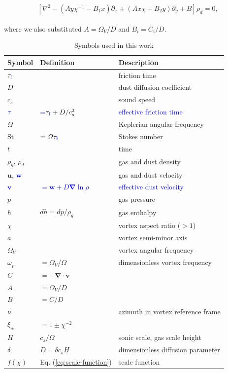 \documentclass[apj]{emulateapj}
\renewcommand{\v}[1]{{\boldsymbol{#1}}} %
\def\blue#1{\textcolor{blue}{#1}}
\newcommand{\del}{\v{\nabla}}
\newcommand{\grad}{\del}
\newcommand{\Div}{\del\cdot}
\newcommand{\Laplace}{\nabla^2}
\newcommand{\Eq}[1]{Eq. (\ref{#1})}
\newcommand{\eq}[1]{\Eq{#1}}
\newcommand{\beq}{\begin{equation}}
\newcommand{\eeq}{\end{equation}}
\newcommand{\tauf}{\tau_{\rm \blue{f}}}
\newcommand{\St}{{\rm St}}
\begin{document}
\beq
\left[\Laplace{} - \left(Ay\chi^{-1} - B_1x\right) \partial_x  +
  \left(A x \chi + B_2y\right) \partial_y + B \right] \rho_d   = 0,  
\label{eq:dust-trapping-cartesian}
\eeq
\\
\noindent where we also substituted  $A=\varOmega_V/D$ and $B_i=C_i/D$.

\begin{table}
\caption[]{Symbols used in this work}
\label{table:symbols}
\begin{center}
\begin{tabular}{l l l}\hline
Symbol & Definition & Description \\\hline
$\tauf$ && friction time\\
$D$ & & dust diffusion coefficient \\
$c_s$ & & sound speed \\
$\blue{\tau}$ &\blue{=$\tauf + D/c_s^2$}& \blue{effective friction time}\\
$\varOmega$ & & Keplerian angular frequency \\
\St & $= \varOmega \tauf$ & Stokes number \\
$t$ &  & time \\
$\rho_g$, $\rho_d$  & & gas and dust density\\
$\v{u}$, \blue{$\v{w}$} & & gas and dust velocity\\
\blue{$\v{v}$} & \blue{$= \v{w} + D\grad\ln\rho$}& \blue{effective dust velocity} \\
$p$ && gas pressure \\
$h$ &$dh=dp/\rho_g$ & gas enthalpy\\
$\chi$ & & vortex aspect ratio ($>1$) \\
$a$ & & vortex semi-minor axis \\
$\varOmega_V$ & & vortex angular frequency \\
$\omega_{_V}$ &  $=\varOmega_V$/$\varOmega$ & dimensionless vortex frequency  \\
$C$ & $=-\Div{\v{v}}$ &  \\
$A$ & $=\varOmega_V/D$ & \\
$B$  &$=C/D$ & \\
$\nu$ & & azimuth in vortex reference frame\\
$\xi_\pm$ & $ = 1\pm\chi^{-2}$ \\
$H$ & $c_s/\varOmega$ & sonic scale, gas scale height\\
$\delta$ & $D=\delta c_s H$ & dimensionless diffusion parameter\\
$f(\chi)$ & \eq{eq:scale-function} & scale function \\

\end{tabular}
\end{center}
\end{table}
\end{document}
